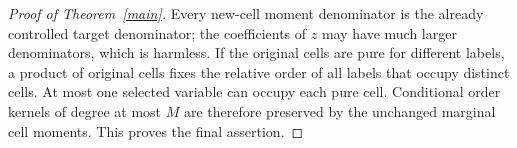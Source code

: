 \documentclass[11pt]{article}
\begin{document}
\begin{proof}[Proof of Theorem~\ref{main}]
Every new-cell moment denominator is the already controlled target
denominator; the coefficients of $z$ may have much larger denominators,
which is harmless. If the original cells are pure for different labels,
a product of original cells fixes the relative order of all labels
that occupy distinct cells. At most one selected variable can occupy
each pure cell. Conditional order kernels of degree at most $M$ are
therefore preserved by the unchanged marginal cell moments. This proves
the final assertion.
\end{proof}
\end{document}
